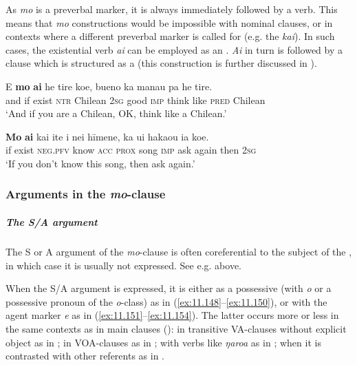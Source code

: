 As \textit{mo} is a preverbal marker, it is always immediately followed by a verb. This means that \textit{mo} constructions would be impossible with nominal clauses, or in contexts where a different preverbal marker is called for (e.g. the  \textit{kai}). In such cases, the existential verb \textit{ai} can be employed as an . \textit{Ai} in turn is followed by a clause which is structured as a  (this construction is further discussed in ).

\ea\label{ex:11.146}
\gll {\ꞌ}E \textbf{mo} \textbf{ai} he tire koe, bueno ka mana{\ꞌ}u pa he tire. \\
and if exist \textsc{ntr} Chilean \textsc{2sg} good \textsc{imp} think like \textsc{pred} Chilean \\

\glt 
‘And if you are a Chilean, OK, think like a Chilean.’ \textstyleExampleref{[R625.098]} 
\z

\ea\label{ex:11.147}
\gll \textbf{Mo} \textbf{ai} kai {\ꞌ}ite i nei hīmene, ka {\ꞌ}ui haka{\ꞌ}ou ia koe.\\
if exist \textsc{neg.pfv} know \textsc{acc} \textsc{prox} song \textsc{imp} ask again then \textsc{2sg}\\

\glt 
‘If you don’t know this song, then ask again.’ \textstyleExampleref{[R615.139]} 
\z

\subsubsection[Arguments in the mo{}-clause]{Arguments in the \textit{mo}{}-clause}\label{sec:11.5.1.2}

\subparagraph{The S/A argument} The S or A argument of the \textit{mo}{}-clause is often coreferential to the subject of the , in which case it is usually not expressed. See e.g.  above.

When the S/A argument is expressed, it is either as a possessive (with  \textit{o} or a possessive pronoun of the \textit{o}{}-class) as in (\ref{ex:11.148}–\ref{ex:11.150}), or with the agent marker \textit{e} as in (\ref{ex:11.151}–\ref{ex:11.154}). The latter occurs more or less in the same contexts as in main clauses (): in transitive VA-clauses without explicit object as in ; in VOA-clauses as in ; with verbs like \textit{ŋaro{\ꞌ}a} as in ; when it is contrasted with other referents as in .

